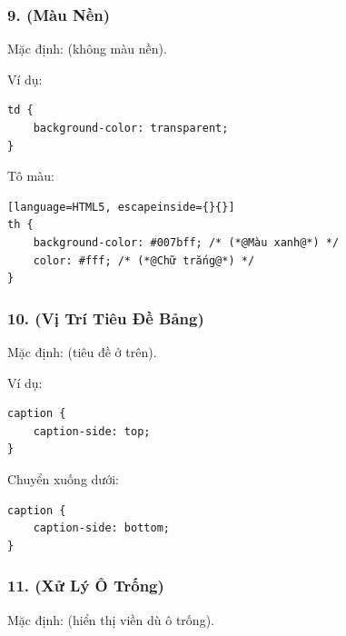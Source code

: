 \subsubsection{9.  (Màu Nền)}

Mặc định:  (không màu nền).

Ví dụ:
\begin{codeWindow}
\begin{lstlisting}[language=HTML5]
td {
    background-color: transparent;
}
\end{lstlisting}
\end{codeWindow}

Tô màu:
\begin{codeWindow}
\begin{lstlisting}[language=HTML5, escapeinside={}{}]
th {
    background-color: #007bff; /* (*@Màu xanh@*) */
    color: #fff; /* (*@Chữ trắng@*) */
}
\end{lstlisting}
\end{codeWindow}

\subsubsection{10.  (Vị Trí Tiêu Đề Bảng)}

Mặc định:  (tiêu đề ở trên).

Ví dụ:
\begin{codeWindow}
\begin{lstlisting}[language=HTML5]
caption {
    caption-side: top;
}
\end{lstlisting}
\end{codeWindow}

Chuyển xuống dưới:
\begin{codeWindow}
\begin{lstlisting}[language=HTML5]
caption {
    caption-side: bottom;
}
\end{lstlisting}
\end{codeWindow}

\subsubsection{11.  (Xử Lý Ô Trống)}

Mặc định:  (hiển thị viền dù ô trống).

